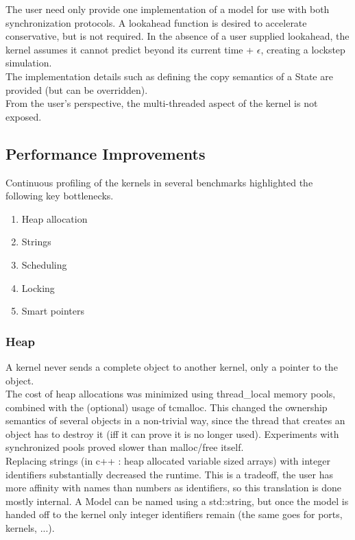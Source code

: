 The user need only provide one implementation of a model for use with both synchronization protocols. A lookahead function is desired to accelerate conservative, but is not required. In the absence of a user supplied lookahead, the kernel assumes it cannot predict beyond its current time + $\epsilon$, creating a lockstep simulation. %
\\
The implementation details such as defining the copy semantics of a State are provided (but can be overridden). \\
From the user's perspective, the multi-threaded aspect of the kernel is not exposed. %

\subsection{Performance Improvements}
Continuous profiling of the kernels in several benchmarks highlighted the following key bottlenecks. 
\begin{enumerate}
	\item Heap allocation
	\item Strings 
	\item Scheduling
	\item Locking
	\item Smart pointers
\end{enumerate}
\subsubsection{Heap}
A kernel never sends a complete object to another kernel, only a pointer to the object.\\
The cost of heap allocations was minimized using thread\_local memory pools, combined with the (optional) usage of tcmalloc. %
This changed the ownership semantics of several objects in a non-trivial way, since the thread that creates an object has to destroy it (iff it can prove it is no longer used). Experiments with synchronized pools proved slower than malloc/free itself. \\
Replacing strings (in c++ : heap allocated variable sized arrays) with integer identifiers substantially decreased the runtime. This is a tradeoff, the user has more affinity with names than numbers as identifiers, so this translation is done mostly internal. A Model can be named using a std::string, but once the model is handed off to the kernel only integer identifiers remain (the same goes for ports, kernels, ...).
\\
